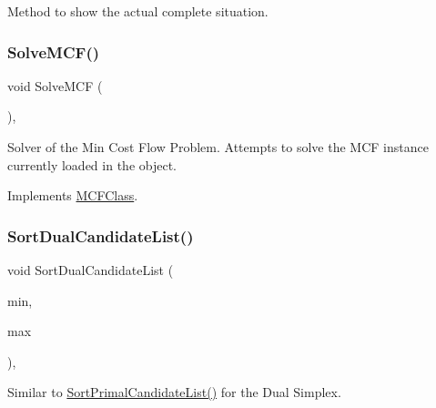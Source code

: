 Method to show the actual complete situation. \mbox{\label{class_m_c_f_simplex_aea7d742cb19c17b17fb0832ea74cdb21}} 
\subsubsection{\texorpdfstring{Solve\+M\+C\+F()}{SolveMCF()}}
{\footnotesize\ttfamily void Solve\+M\+CF (\begin{DoxyParamCaption}\item[{void}]{ }\end{DoxyParamCaption})\hspace{0.3cm}{\ttfamily [override]}, {\ttfamily [virtual]}}

Solver of the Min Cost Flow Problem. Attempts to solve the M\+CF instance currently loaded in the object. 

Implements \mbox{\hyperlink{class_m_c_f_class_ac0d96429d896a2d878a5f057535ab1ee}{M\+C\+F\+Class}}.

\mbox{\label{class_m_c_f_simplex_ab0a21a3677bc14ce294fb95a31b25c23}} 
\subsubsection{\texorpdfstring{Sort\+Dual\+Candidate\+List()}{SortDualCandidateList()}}
{\footnotesize\ttfamily void Sort\+Dual\+Candidate\+List (\begin{DoxyParamCaption}\item[{\mbox{\hyperlink{class_m_c_f_class_ad53d6229d7ec28555a9c9c2fd9abf773}{Index}}}]{min,  }\item[{\mbox{\hyperlink{class_m_c_f_class_ad53d6229d7ec28555a9c9c2fd9abf773}{Index}}}]{max }\end{DoxyParamCaption})\hspace{0.3cm}{\ttfamily [inline]}, {\ttfamily [private]}}

Similar to \mbox{\hyperlink{class_m_c_f_simplex_a992f9de53818d841b969210dc1b892cd}{Sort\+Primal\+Candidate\+List()}} for the Dual Simplex. \mbox{\label{class_m_c_f_simplex_a992f9de53818d841b969210dc1b892cd}} 
